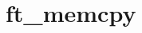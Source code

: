 \chapter{ft\+\_\+memcpy}
\hypertarget{md_Documentation_2ft__memcpy}{}\label{md_Documentation_2ft__memcpy}
